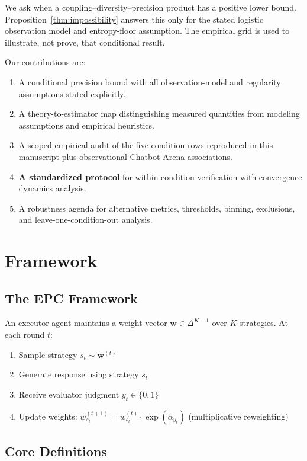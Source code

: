 \documentclass[11pt]{article}
\begin{document}
We ask when a coupling--diversity--precision product has a positive lower bound. Proposition~\ref{thm:impossibility} answers this only for the stated logistic observation model and entropy-floor assumption. The empirical grid is used to illustrate, not prove, that conditional result.

Our contributions are:
\begin{enumerate}[leftmargin=*,nosep]
 \item A conditional precision bound with all observation-model and regularity assumptions stated explicitly.
 \item A theory-to-estimator map distinguishing measured quantities from modeling assumptions and empirical heuristics.
 \item A scoped empirical audit of the five condition rows reproduced in this manuscript plus observational Chatbot Arena associations.
 \item \textbf{A standardized protocol} for within-condition verification with convergence dynamics analysis.
 \item A robustness agenda for alternative metrics, thresholds, binning, exclusions, and leave-one-condition-out analysis.
\end{enumerate}

\section{Framework}

\subsection{The EPC Framework}

An executor agent maintains a weight vector $\mathbf{w} \in \Delta^{K-1}$ over $K$ strategies. At each round $t$:
\begin{enumerate}[leftmargin=*,nosep]
 \item Sample strategy $s_t \sim \mathbf{w}^{(t)}$
 \item Generate response using strategy $s_t$
 \item Receive evaluator judgment $y_t \in \{0, 1\}$
 \item Update weights: $w_{s_t}^{(t+1)} = w_{s_t}^{(t)} \cdot \exp(\alpha_{y_t})$ (multiplicative reweighting)
\end{enumerate}

\subsection{Core Definitions}
\end{document}
